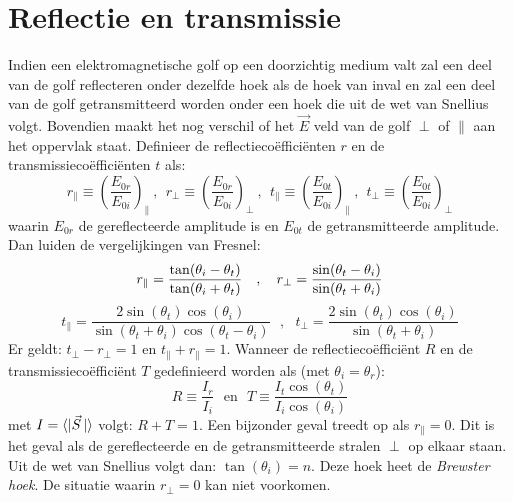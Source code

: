 \section{Reflectie en transmissie}
Indien een elektromagnetische golf op een doorzichtig medium valt zal een deel
van de golf reflecteren onder dezelfde hoek als de hoek van inval en zal een
deel van de golf getransmitteerd worden onder een hoek die uit de wet van
Snellius volgt. Bovendien maakt het nog verschil of het $\vec{E}$ veld van
de golf $\perp$ of $\parallel$ aan het oppervlak staat. Definieer de
reflectieco\"effici\"enten $r$ en de transmissieco\"effici\"enten $t$ als:
\[
r_\parallel\equiv\left(\frac{E_{0r}}{E_{0i}}\right)_\parallel~,~~
r_\perp\equiv\left(\frac{E_{0r}}{E_{0i}}\right)_\perp~,~~
t_\parallel\equiv\left(\frac{E_{0t}}{E_{0i}}\right)_\parallel~,~~
t_\perp\equiv\left(\frac{E_{0t}}{E_{0i}}\right)_\perp
\]
waarin $E_{0r}$ de gereflecteerde amplitude is en $E_{0t}$ de getransmitteerde
amplitude. Dan luiden de vergelijkingen van Fresnel:
\[
r_\parallel=\frac{\tan(\theta_i-\theta_t)}{\tan(\theta_i+\theta_t)}~~~,~~~
r_\perp    =\frac{\sin(\theta_t-\theta_i)}{\sin(\theta_t+\theta_i)}\\
\]
\[
t_\parallel=\frac{2\sin(\theta_t)\cos(\theta_i)}{\sin(\theta_t+\theta_i)\cos(\theta_t-\theta_i)}~~~,~~~
t_\perp    =\frac{2\sin(\theta_t)\cos(\theta_i)}{\sin(\theta_t+\theta_i)}
\]
Er geldt: $t_\perp-r_\perp=1$ en $t_\parallel+r_\parallel=1$. Wanneer de
reflectieco\"effici\"ent $R$ en de transmissieco\"effici\"ent $T$
gedefinieerd worden als (met $\theta_i=\theta_r$):
\[
R\equiv\frac{I_r}{I_i}~~~\mbox{en}~~~T\equiv\frac{I_t\cos(\theta_t)}{I_i\cos(\theta_i)}
\]
met $I=\langle|\vec{S}\,|\rangle$ volgt: $R+T=1$. Een bijzonder geval treedt op
als $r_\parallel=0$. Dit is het geval als de gereflecteerde en de getransmitteerde
stralen $\perp$ op elkaar staan. Uit de wet van Snellius volgt dan:
$\tan(\theta_i)=n$. Deze hoek heet de {\it Brewster hoek}. De situatie waarin
$r_\perp=0$ kan niet voorkomen.

